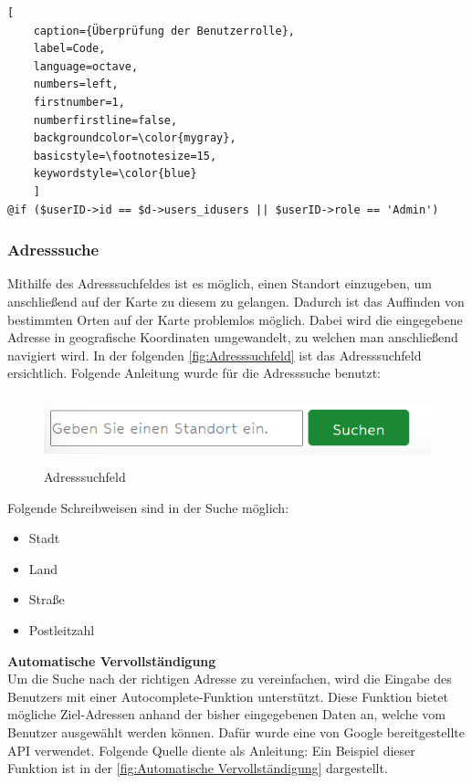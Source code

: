 \begin{lstlisting}[
	caption={Überprüfung der Benutzerrolle},
	label=Code,
	language=octave,
	numbers=left,
	firstnumber=1,
	numberfirstline=false,
	backgroundcolor=\color{mygray},
	basicstyle=\footnotesize=15,
	keywordstyle=\color{blue}
	]
@if ($userID->id == $d->users_idusers || $userID->role == 'Admin')

\end{lstlisting}


\newpage
\subsubsection{Adresssuche}
Mithilfe des Adresssuchfeldes ist es möglich, einen Standort einzugeben, um anschließend auf der Karte zu diesem zu gelangen. Dadurch ist das Auffinden von bestimmten Orten auf der Karte problemlos möglich. Dabei wird die eingegebene Adresse in geografische Koordinaten umgewandelt, zu welchen man anschließend navigiert wird. In der folgenden \autoref{fig:Adresssuchfeld} ist das Adresssuchfeld ersichtlich. Folgende Anleitung wurde für die Adresssuche benutzt: \cite{Adresssuchfeld}
\begin{figure}[h]
	\centering
	\includegraphics[height=2cm,width=15cm]{images/Adresssuchfeld}
	\caption{Adresssuchfeld}
	\label{fig:Adresssuchfeld}
\end{figure}

Folgende Schreibweisen sind in der Suche möglich:
\begin{itemize}
	\item Stadt 
	\item Land
	\item Straße 
	\item Postleitzahl 
\end{itemize}


\textbf{Automatische Vervollständigung} \\
Um die Suche nach der richtigen Adresse zu vereinfachen, wird die Eingabe des Benutzers mit einer Autocomplete-Funktion unterstützt. Diese Funktion bietet mögliche Ziel-Adressen anhand der bisher eingegebenen Daten an, welche vom Benutzer ausgewählt werden können. Dafür wurde eine von Google bereitgestellte API verwendet. Folgende Quelle diente als Anleitung: \cite{Autocomplete}
Ein Beispiel dieser Funktion ist in der \autoref{fig:Automatische Vervollständigung} dargestellt.

